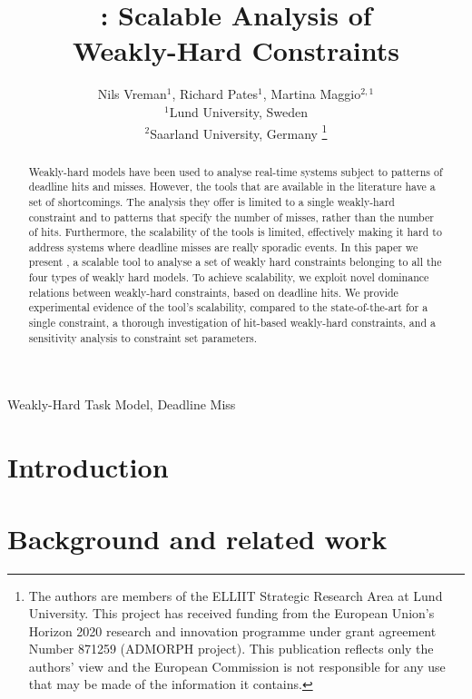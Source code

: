 \documentclass[conference]{IEEEtran}
\title{\tool{}: Scalable Analysis of \\ Weakly-Hard Constraints}
\author{Nils Vreman$^1$, Richard Pates$^1$, Martina Maggio$^{2,1}$\\
$^1$Lund University, Sweden\\
$^2$Saarland University, Germany
\thanks{The authors are members of the ELLIIT Strategic Research Area at Lund University. 
This project has received funding from the European Union's Horizon 2020 research and innovation programme under grant agreement Number 871259 (ADMORPH project). 
This publication reflects only the authors' view and the European Commission is not responsible for any use that may be made of the information it contains.}}
\begin{document}
\makeatletter
\def\@artifactstamptop{0.1cm}
\def\@artifactstampright{0.1cm}
\def\@artifactstampwidth{2.5cm}
\let\@aetitle\@maketitle
\def\@maketitle{
\begin{tikzpicture}[remember picture,overlay,shift={(current page.north east)}]%
\node[anchor=north east,xshift=-\@artifactstampright,yshift=-\@artifactstamptop]{\texttt{[image: badge\_rtas\_AE]}};%
\end{tikzpicture}%
\@aetitle}
\makeatother


\maketitle

\begin{abstract}
Weakly-hard models have been used to analyse real-time systems subject to patterns of deadline hits and misses. However, the tools that are available in the literature have a set of shortcomings. The analysis they offer is limited to a single weakly-hard constraint and to patterns that specify the number of misses, rather than the number of hits. Furthermore, the scalability of the tools is limited, effectively making it hard to address systems where deadline misses are really sporadic events. In this paper we present \tool{}, a scalable tool to analyse a set of weakly hard constraints belonging to all the four types of weakly hard models. To achieve scalability, we exploit novel dominance relations between weakly-hard constraints, based on deadline hits. We provide experimental evidence of the tool's scalability, compared to the state-of-the-art for a single constraint, a thorough investigation of hit-based weakly-hard constraints, and a sensitivity analysis to constraint set parameters.
\end{abstract}

\begin{IEEEkeywords}
Weakly-Hard Task Model, Deadline Miss
\end{IEEEkeywords}

\section{Introduction}
\label{sec:intro}


\section{Background and related work}
\label{sec:background}

\end{document}
